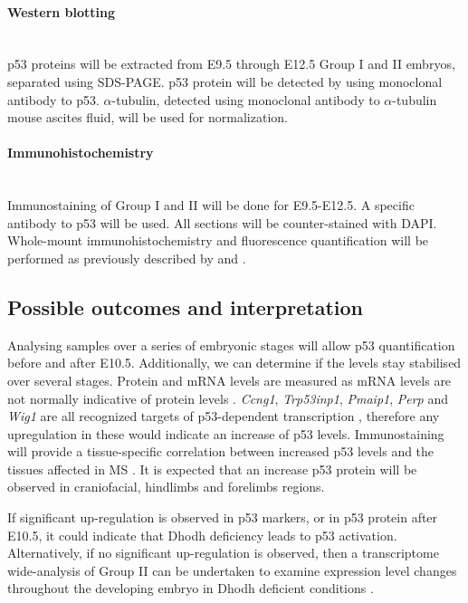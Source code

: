 \documentclass[12pt]{article}
\begin{document}
\paragraph{Western blotting}
~\\p53 proteins will be extracted from E9.5 through E12.5 Group I and II embryos,  separated using SDS-PAGE.  p53 protein will be detected by using monoclonal antibody to p53. $\alpha$-tubulin, detected using monoclonal antibody to $\alpha$-tubulin mouse ascites fluid, will be used for normalization.

\paragraph{Immunohistochemistry}
~\\Immunostaining of Group I and II will be done for E9.5-E12.5. A specific antibody to p53 will be used. All sections will be counter-stained with DAPI. Whole-mount immunohistochemistry and fluorescence quantification will be performed as previously described by \cite{jones2008prevention} and \cite{ueda2006roles}.  



\subsection{Possible outcomes and interpretation}
Analysing samples over a series of embryonic stages will allow p53 quantification before and after E10.5. Additionally, we can determine if the levels stay stabilised over several stages. Protein and mRNA levels are measured as mRNA levels are not normally indicative of protein levels \citep{de2009global}.  \textit{Ccng1}, \textit{Trp53inp1}, \textit{Pmaip1}, \textit{Perp} and \textit{Wig1} are all recognized targets of p53-dependent transcription \citep{levine1997p53}, therefore any upregulation in these would indicate an increase of p53 levels.  Immunostaining will provide a tissue-specific correlation between increased p53 levels and the tissues affected in MS \citep{jones2008prevention}. It is expected that an increase p53 protein will be observed in craniofacial, hindlimbs and forelimbs regions. 

If significant up-regulation is observed in p53 markers, or in p53 protein after E10.5, it could indicate that Dhodh deficiency leads to p53 activation. Alternatively, if no significant up-regulation is observed, then a transcriptome wide-analysis of Group II can be undertaken to examine expression level changes throughout the developing embryo in Dhodh deficient conditions . 
\end{document}
